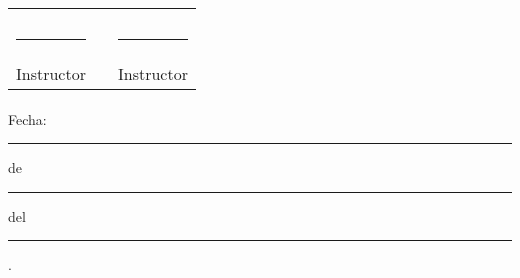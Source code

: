 \begin{tabular}{ l l l }
	\myTutorOne		& \hspace{20 mm} & \myTutorTwo \\
		& \vspace{10 mm} &  \\
	\rule{13em}{0.6pt} 						& \hspace{20 mm} & \rule{11em}{0.5pt} \\
	Instructor		& \hspace{20 mm} & Instructor \\
\end{tabular}

\paragraph{}Fecha:  \rule{2em}{0.5pt} de \rule{10em}{0.5pt} del \rule{3em}{0.5pt}.